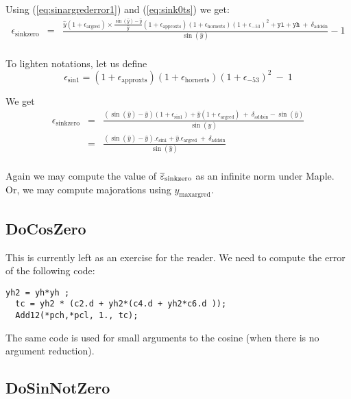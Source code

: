 Using (\ref{eq:sinargrederror1}) and (\ref{eq:sink0ts}) we get:
\begin{eqnarray*}
  \epsilon_{\mathrm{sinkzero}} 
  &=& \frac{\hat{y}(1+\epsilon_{\mathrm{argred}})\times\frac{\sin(\hat{y})-\hat{y}}{\hat{y}}(1+\epsilon_{\mathrm{approxts}})(1+\epsilon_{\mathrm{hornerts}})(1+\epsilon_{-53})^2 + \mathtt{yl} + \mathtt{yh}    \ +\  \delta_{\mathrm{addsin}} }{\sin(\hat{y})} -1\\
\end{eqnarray*}

To lighten notations, let us define 
\begin{equation}
 \epsilon_{\mathrm{sin1}} = (1+\epsilon_{\mathrm{approxts}})(1+\epsilon_{\mathrm{hornerts}})(1+\epsilon_{-53})^2 \ -\ 1
  \label{eq:epssin1}
\end{equation}

We get
\begin{eqnarray*}
  \epsilon_{\mathrm{sinkzero}} 
  &=& \frac{(\sin(\hat{y})-\hat{y})(1+\epsilon_{\mathrm{sin1}}) + \hat{y}(1+\epsilon_{\mathrm{argred}})    \ +\   \delta_{\mathrm{addsin}} - \sin(\hat{y})}{\sin(\hat{y})}\\
  &=& \frac{(\sin(\hat{y})-\hat{y}).\epsilon_{\mathrm{sin1}} + \hat{y}.\epsilon_{\mathrm{argred}}    \ +\ \delta_{\mathrm{addsin}}}{\sin(\hat{y})}\\
\label{eq:sinkzero}
\end{eqnarray*}

Again we may compute the value of ${\overline{\varepsilon}}_{\mathrm{sinkzero}}$ as an
infinite norm under Maple. Or, we may compute majorations using
$y_{\mathrm{maxargred}}$.

 

\subsection{DoCosZero}
This is currently left as an exercise for the reader. We need to
compute the error of the following code:
\begin{lstlisting}[caption={DoCosZero},firstnumber=1]
  yh2 = yh*yh ;                                   
  tc = yh2 * (c2.d + yh2*(c4.d + yh2*c6.d ));	  
  Add12(*pch,*pcl, 1., tc);		          
\end{lstlisting}

The same code is used for small arguments to the cosine (when there is
no argument reduction).

\subsection{DoSinNotZero}

